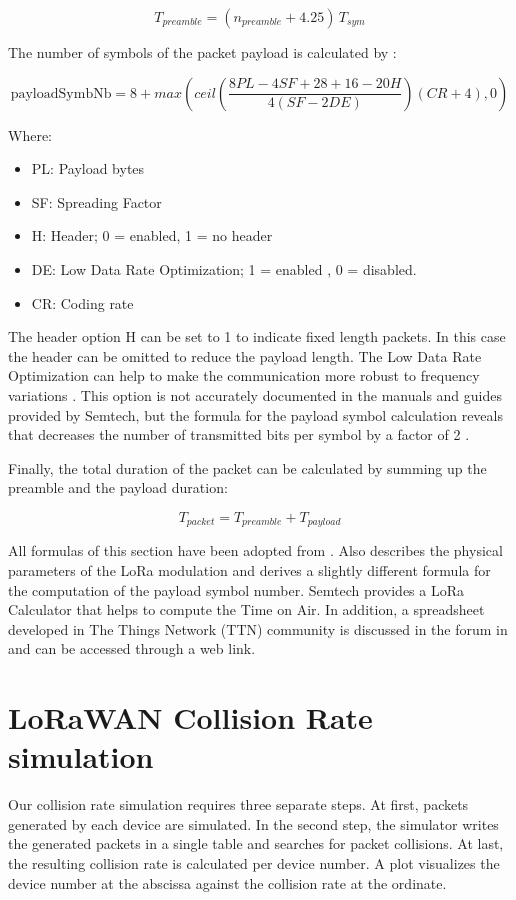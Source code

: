 \documentclass{article}
\begin{document}
$$T_{preamble} = ( n_{preamble} + 4.25 ) \, T_{sym}$$

The number of symbols of the packet payload is calculated by \cite{loramodem}:

$$ \textrm{payloadSymbNb} = 8 + max \left( ceil \left( \frac{ 8PL - 4SF + 28 + 16 - 20H }{ 4 \left( SF - 2DE \right) } \right) \left( CR + 4 \right) , 0 \right) $$

Where:
\begin{itemize}
        \item PL: Payload bytes
        \item SF: Spreading Factor
        \item H: Header; 0 = enabled, 1 = no header
        \item DE: Low Data Rate Optimization; 1 = enabled , 0 = disabled.
        \item CR: Coding rate
\end{itemize}
\vspace*{\baselineskip}

The header option H can be set to 1 to indicate fixed length packets. In this
case the header can be omitted to reduce the payload length. The Low Data Rate
Optimization can help to make the communication more robust to frequency
variations \cite{loramodem}. This option is not accurately documented in the
manuals and guides provided by Semtech, but the formula for the payload symbol
calculation reveals that decreases the number of transmitted bits per symbol by
a factor of 2 \cite{augustin2016study}.

Finally, the total duration of the packet can be calculated by summing up the
preamble and the payload duration:

$$T_{packet} = T_{preamble} + T_{payload}$$

All formulas of this section have been adopted from \cite{loramodem}. Also
\cite{augustin2016study} describes the physical parameters of the LoRa
modulation and derives a slightly different formula for the computation of the
payload symbol number. Semtech provides a LoRa Calculator that helps to compute
the Time on Air. In addition, a spreadsheet developed in The Things Network
(TTN) community is discussed in the forum in \cite{loraspreadsheet} and can be
accessed through a web link.

\section{LoRaWAN Collision Rate simulation}\label{sec:simulator}
Our collision rate simulation requires three separate steps. At first, packets
generated by each device are simulated. In the second step, the simulator
writes the generated packets in a single table and searches for packet
collisions. At last, the resulting collision rate is calculated per device
number. A plot visualizes the device number at the abscissa against the
collision rate at the ordinate.
\end{document}
